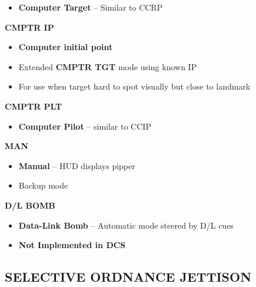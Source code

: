 \begin{tableitemize}
{\begin{subitemize}
        \begin{itemize}
            \item \textbf{Computer Target} -- Similar to CCRP
        \end{itemize}
        \item \textbf{CMPTR IP}
        \begin{itemize}
            \item \textbf{Computer initial point}
            \item Extended \textbf{CMPTR TGT} mode using known IP
            \item For use when target hard to spot visually but close to landmark
        \end{itemize}
        \item \textbf{CMPTR PLT}
        \begin{itemize}
            \item \textbf{Computer Pilot} -- similar to CCIP
        \end{itemize}
        \item \textbf{MAN}
        \begin{itemize}
            \item \textbf{Manual} -- HUD displays pipper
            \item Backup mode
        \end{itemize}
        \item \textbf{D/L BOMB}
        \begin{itemize}
            \item \textbf{Data-Link Bomb} -- Automatic mode steered by D/L cues
            \item \textbf{Not Implemented in DCS}
        \end{itemize}
    \end{subitemize}}
\end{tableitemize}


\subsection{SELECTIVE ORDNANCE JETTISON}
\begin{tablenumerate}
\end{tablenumerate}


